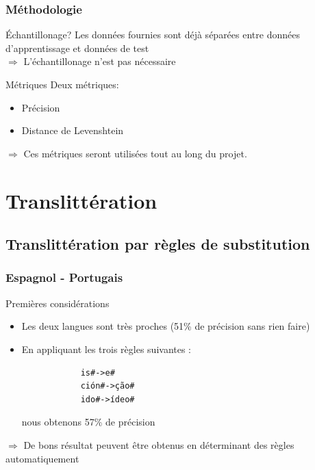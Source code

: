 \documentclass{beamer}
\begin{document}
\begin{frame}
\frametitle{Méthodologie}

	\begin{block}{Échantillonage?}
	Les données fournies sont déjà séparées entre données d'apprentissage et données de test\\
	$\Longrightarrow$ L'échantillonage n'est pas nécessaire
	\end{block}

	\begin{block}{Métriques}
	Deux métriques:
		\begin{itemize}
            \item Précision
            \item Distance de Levenshtein
		\end{itemize}		
	\end{block}
	
	\begin{alertblock}{}
	$\Longrightarrow$ Ces métriques seront utilisées tout au long du projet.
	\end{alertblock}	
	
\end{frame}

\section{Translittération}


\begin{frame}
\end{frame}



\subsection{Translittération par règles de substitution}

\begin{frame}[fragile]
	\frametitle{Espagnol - Portugais}

	\begin{block}{Premières considérations}
		\begin{itemize}
		\item Les deux langues sont très proches (51\% de précision sans rien faire)
		\item En appliquant les trois règles suivantes : {\scriptsize \begin{verbatim}
			is#->e#
			ción#->ção#
			ido#->ídeo#
			\end{verbatim}}
			nous obtenons 57\% de précision
		\end{itemize}
	\end{block}

	\begin{alertblock}{}
	$\Longrightarrow$ De bons résultat peuvent être obtenus en déterminant des règles automatiquement 
	\end{alertblock}
\end{frame}
\end{document}
